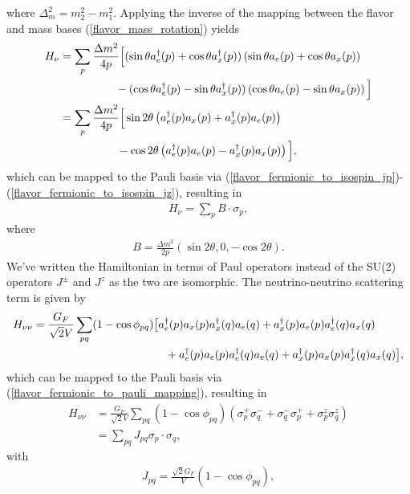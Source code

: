 \documentclass[Dual]{msu-thesis}
\begin{document}
where $\Delta_m^2=m_2^2-m_1^2$. Applying the inverse of the mapping between the flavor and mass bases (\ref{flavor_mass_rotation}) yields
\begin{align}
H_\nu
&=
\sum_p\frac{\Delta m^2}{4p}\Big{[}
(\sin\theta a^\dagger_e(p)+\cos\theta a^\dagger_x(p))\left(\sin\theta a_e(p)+\cos\theta a_x(p)\right)
\nonumber
\\
&\hspace{17.5mm}-
(\cos\theta a^\dagger_e(p)-\sin\theta a^\dagger_x(p))\left(\cos\theta a_e(p)-\sin\theta a_x(p)\right)
\Big{]}
\\
&=
\sum_p\frac{\Delta m^2}{4p}\Big{[}
\sin2\theta\left(a^\dagger_e(p)a_x(p)+a^\dagger_x(p)a_e(p)\right)
\nonumber 
\\
&\hspace{18mm}-
\cos2\theta\left(a^\dagger_e(p)a_e(p)-a^\dagger_x(p)a_x(p)\right)
\Big{]}
,\end{align}
which can be mapped to the Pauli basis via (\ref{flavor_fermionic_to_isospin_jp})-(\ref{flavor_fermionic_to_isospin_jz}), resulting in
\begin{align}
\label{neutrino_neutrino_interaction}
H_\nu = \sum_p B\cdot \sigma_p
,\end{align}
where
\begin{align}
B=\frac{\Delta m^2}{2p}(\sin2\theta,0,-\cos2\theta).
\end{align}
We've written the Hamiltonian in terms of Paul operators instead of the SU(2) operators $J^\pm$ and $J^z$ as the two are isomorphic. The neutrino-neutrino scattering term is given by
\begin{align}
H_{\nu\nu}
&=
\frac{G_F}{\sqrt{2}V}\sum_{pq}(1-\cos\phi_{pq})
\big{[}
a^\dagger_e(p)a_x(p)a^\dagger_x(q)a_e(q)+a^\dagger_x(p)a_e(p)a^\dagger_e(q)a_x(q)
\nonumber
\\
&\hspace{41.5mm}+
a^\dagger_e(p)a_e(p)a^\dagger_e(q)a_e(q)+a^\dagger_x(p)a_x(p)a^\dagger_x(q)a_x(q)
\big{]}
,\end{align}
which can be mapped to the Pauli basis via (\ref{flavor_fermionic_to_pauli_mapping}), resulting in
\begin{align}
\label{neutrino_neutrino_term2}
H_{\nu\nu}
&=
\frac{G_F}{\sqrt{2}V}\sum_{pq}(1-\cos\phi_{pq})
\left(
\sigma^+_p\sigma^-_q+\sigma^-_q\sigma^+_p + \sigma^z_p\sigma^z_q
\right)
\nonumber
\\
&=
\sum_{pq}J_{pq}
\sigma_p\cdot\sigma_q
,\end{align}
with
\begin{align}
J_{pq}=\frac{\sqrt{2}G_F}{V}(1-\cos\phi_{pq})
,\end{align}
\end{document}
